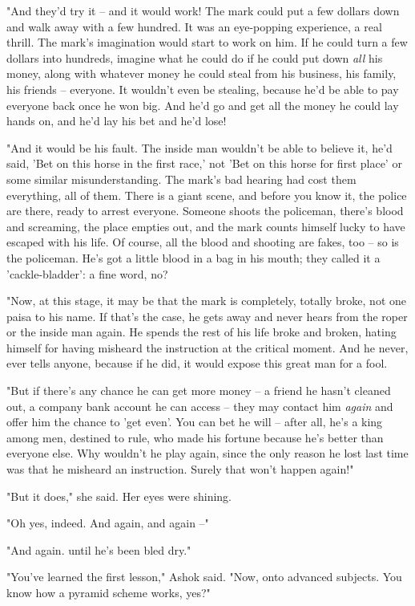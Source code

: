 "And they'd try it -- and it would work! The mark could put a few
dollars down and walk away with a few hundred. It was an
eye-popping experience, a real thrill. The mark's imagination would
start to work on him. If he could turn a few dollars into hundreds,
imagine what he could do if he could put down \emph{all} his money,
along with whatever money he could steal from his business, his
family, his friends -- everyone. It wouldn't even be stealing,
because he'd be able to pay everyone back once he won big. And he'd
go and get all the money he could lay hands on, and he'd lay his
bet and he'd lose!

"And it would be his fault. The inside man wouldn't be able to
believe it, he'd said, 'Bet on this horse in the first race,' not
'Bet on this horse for first place' or some similar
misunderstanding. The mark's bad hearing had cost them everything,
all of them. There is a giant scene, and before you know it, the
police are there, ready to arrest everyone. Someone shoots the
policeman, there's blood and screaming, the place empties out, and
the mark counts himself lucky to have escaped with his life. Of
course, all the blood and shooting are fakes, too -- so is the
policeman. He's got a little blood in a bag in his mouth; they
called it a 'cackle-bladder': a fine word, no?

"Now, at this stage, it may be that the mark is completely, totally
broke, not one paisa to his name. If that's the case, he gets away
and never hears from the roper or the inside man again. He spends
the rest of his life broke and broken, hating himself for having
misheard the instruction at the critical moment. And he never, ever
tells anyone, because if he did, it would expose this great man for
a fool.

"But if there's any chance he can get more money -- a friend he
hasn't cleaned out, a company bank account he can access -- they
may contact him \emph{again} and offer him the chance to 'get
even'. You can bet he will -- after all, he's a king among men,
destined to rule, who made his fortune because he's better than
everyone else. Why wouldn't he play again, since the only reason he
lost last time was that he misheard an instruction. Surely that
won't happen again!"

"But it does," she said. Her eyes were shining.

"Oh yes, indeed. And again, and again --"

"And again. until he's been bled dry."

"You've learned the first lesson," Ashok said. "Now, onto advanced
subjects. You know how a pyramid scheme works, yes?"

